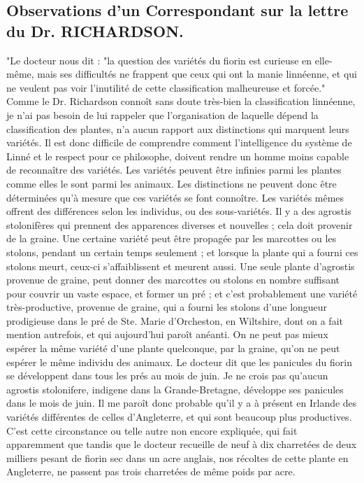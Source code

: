 \subsection{Observations d'un Correspondant sur la lettre du Dr. RICHARDSON.}
"Le docteur nous dit : "la question des variétés du fiorin est curieuse en elle-même, mais ses difficultés ne frappent que ceux qui ont la manie linnéenne, et qui ne veulent pas voir l'inutilité de cette classification malheureuse et forcée."
Comme le Dr. Richardson connoît sans doute très-bien la classification linnéenne, je n'ai pas besoin de lui rappeler que l'organisation de laquelle dépend la classification des plantes, n'a aucun rapport aux distinctions qui marquent leurs variétés. Il est donc difficile de comprendre comment l'intelligence du système de Linné et le respect pour ce philosophe, doivent rendre un homme moins capable de reconnaître des variétés. \setcounter{page}{256} Les variétés peuvent être infinies parmi les plantes comme elles le sont parmi les animaux. Les distinctions ne peuvent donc être déterminées qu'à mesure que ces variétés se font connoître. Les variétés mêmes offrent des différences selon les individus, ou des sous-variétés. Il y a des agrostis stolonifères qui prennent des apparences diverses et nouvelles ; cela doit provenir de la graine. Une certaine variété peut être propagée par les marcottes ou les stolons, pendant un certain temps seulement ; et lorsque la plante qui a fourni ces stolons meurt, ceux-ci s'affaiblissent et meurent aussi. Une seule plante d'agrostis provenue de graine, peut donner des marcottes ou stolons en nombre suffisant pour couvrir un vaste espace, et former un pré ; et c'est probablement une variété très-productive, provenue de graine, qui a fourni les stolons d'une longueur prodigieuse dans le pré de Ste. Marie d'Orcheston, en Wiltshire, dont on a fait mention autrefois, et qui aujourd'hui paroît anéanti. On ne peut pas mieux espérer la même variété d'une plante quelconque, par la graine, qu'on ne peut espérer le même individu des animaux.
Le docteur dit que les panicules du fiorin se développent dans tous les prés au mois\setcounter{page}{257} de juin. Je ne crois pas qu'aucun agrostis stolonifere, indigene dans la Grande-Bretagne, développe ses panicules dans le mois de juin. Il me paroît donc probable qu'il y a à présent en Irlande des variétés différentes de celles d'Angleterre, et qui sont beaucoup plus productives. C'est cette circonstance ou telle autre non encore expliquée, qui fait apparemment que tandis que le docteur recueille de neuf à dix charretées de deux milliers pesant de fiorin sec dans un acre anglais, nos récoltes de cette plante en Angleterre, ne passent pas trois charretées de même poids par acre.
